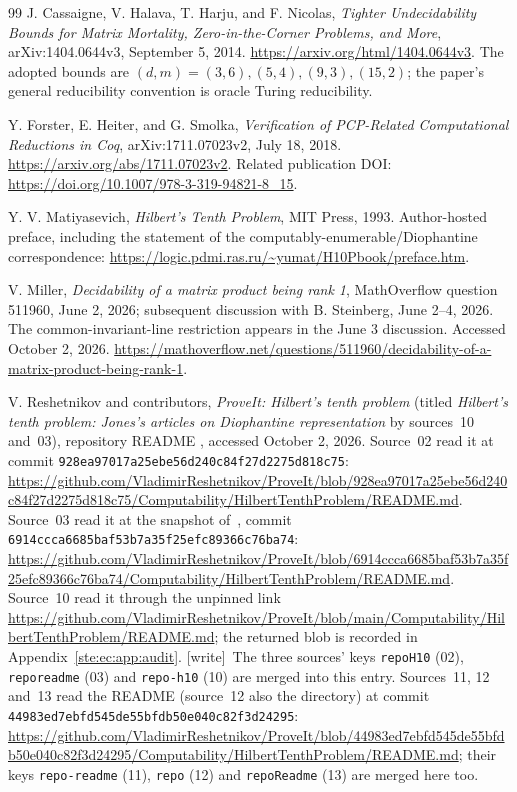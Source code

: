 \documentclass[11pt,letterpaper]{article}
\theoremstyle{definition}
\theoremstyle{remark}
\newcommand{\repo}{\texttt{928ea97017a25ebe56d240c84f27d2275d818c75}}
\newcommand{\wtag}{\textup{[write]}}
\begin{document}
\begin{thebibliography}{99}
J. Cassaigne, V. Halava, T. Harju, and F. Nicolas,
\emph{Tighter Undecidability Bounds for Matrix Mortality, Zero-in-the-Corner
Problems, and More}, arXiv:1404.0644v3, September 5, 2014.
\url{https://arxiv.org/html/1404.0644v3}.
The adopted bounds are $(d,m)=(3,6),(5,4),(9,3),(15,2)$; the paper's general
reducibility convention is oracle Turing reducibility.

Y. Forster, E. Heiter, and G. Smolka,
\emph{Verification of PCP-Related Computational Reductions in Coq},
arXiv:1711.07023v2, July 18, 2018.
\url{https://arxiv.org/abs/1711.07023v2}.
Related publication DOI: \url{https://doi.org/10.1007/978-3-319-94821-8_15}.

Y. V. Matiyasevich, \emph{Hilbert's Tenth Problem}, MIT Press, 1993.
Author-hosted preface, including the statement of the
computably-enumerable/Diophantine correspondence:
\url{https://logic.pdmi.ras.ru/~yumat/H10Pbook/preface.htm}.

V. Miller, \emph{Decidability of a matrix product being rank 1},
MathOverflow question 511960, June 2, 2026; subsequent discussion with
B. Steinberg, June 2--4, 2026. The common-invariant-line restriction appears in
the June 3 discussion. Accessed October 2, 2026.
\url{https://mathoverflow.net/questions/511960/decidability-of-a-matrix-product-being-rank-1}.

V. Reshetnikov and contributors, \emph{ProveIt: Hilbert's tenth problem} (titled \emph{Hilbert's tenth problem: Jones's articles on Diophantine representation} by sources~10 and~03), repository README , accessed October 2, 2026.
Source~02 read it at commit \repo:
\url{https://github.com/VladimirReshetnikov/ProveIt/blob/928ea97017a25ebe56d240c84f27d2275d818c75/Computability/HilbertTenthProblem/README.md}.
Source~03 read it at the snapshot of~\cite{repoReview}, commit \texttt{6914ccca6685baf53b7a35f25efc89366c76ba74}:
\url{https://github.com/VladimirReshetnikov/ProveIt/blob/6914ccca6685baf53b7a35f25efc89366c76ba74/Computability/HilbertTenthProblem/README.md}.
Source~10 read it through the unpinned link
\url{https://github.com/VladimirReshetnikov/ProveIt/blob/main/Computability/HilbertTenthProblem/README.md}; the returned blob is recorded in Appendix~\ref{ste:ec:app:audit}.
\wtag\ The three sources' keys \texttt{repoH10} (02), \texttt{reporeadme} (03) and \texttt{repo-h10} (10) are merged into this entry. Sources~11, 12 and~13 read the README (source~12 also the directory) at commit \texttt{44983ed7ebfd545de55bfdb50e040c82f3d24295}:
\url{https://github.com/VladimirReshetnikov/ProveIt/blob/44983ed7ebfd545de55bfdb50e040c82f3d24295/Computability/HilbertTenthProblem/README.md}; their keys \texttt{repo-readme} (11), \texttt{repo} (12) and \texttt{repoReadme} (13) are merged here too.


\end{thebibliography}
\end{document}
